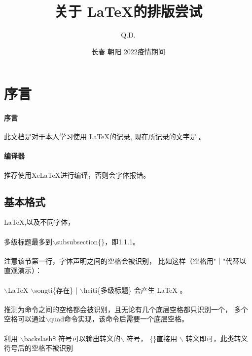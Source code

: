 \documentclass[UTF8]{ctexart}
\title{关于 \LaTeX 的排版尝试}
\author{Q.D.}
\date{长春 \quad 朝阳 \quad 2022疫情期间}
\begin{document}
\maketitle

\section{序言}

\paragraph{序言}
此文档是对于本人学习使用 \LaTeX 的记录,
现在所记录的文字是 。
\paragraph{编译器} 推荐使用XeLaTeX进行编译，否则会字体报错。


\subsection{基本格式}

\LaTeX {},以及不同字体，
\paragraph{} 多级标题最多到$\backslash$subsubsection\{\}，即1.1.1。
\paragraph{} 注意该节第一行，字体声明之间的空格会被识别，
比如这样（空格用"｜"代替以直观演示）：

\paragraph{} %
 $\backslash$LaTeX $\backslash$songti\{存在\} | $\backslash$heiti\{多级标题\}
\quad
会产生
\quad
\LaTeX {} 
\quad
{}。
\paragraph{} 推测为命令之间的空格都会被识别，且无论有几个底层空格都只识别一个，
多个空格可以通过$\backslash$quad命令实现，该命令后需要一个底层空格。
\paragraph{} 利用 $\backslash$backslash\$ 符号可以输出转义的$\backslash$ 符号，
\{\}直接用 $\backslash$ 转义即可，此类转义符号后的空格不被识别
\end{document}
